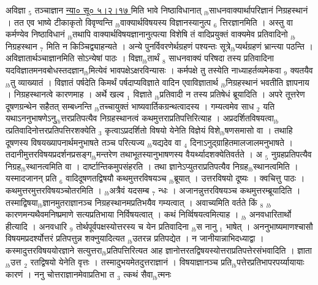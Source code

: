 \documentclass[article,12pt,a4paper]{memoir}%
\begin{document}
	  
	  \pstart \leavevmode%
	अविज्ञा {\tiny $_{5}$} तञ्चाज्ञान \href{http://sarit.indology.info/?cref=ns\%C5\%AB.5.2.17}{न्या० सू० ५।२।१७ } मिति भावे निष्ठाविधानात् {\tiny $_{lb}$}साधनवाक्यार्थापरिज्ञानं निग्रहस्थानं । तत एव भाष्ये टीकाकृतो विवृण्वन्ति {\tiny $_{lb}$}वाक्यार्थविषयस्य विज्ञानस्यानुत्प {\tiny $_{6}$} त्तिरज्ञानमिति । अस्तु वा कर्मण्येव निष्ठाविधानं {\tiny $_{lb}$}तथापि वाक्यार्थविषयज्ञानानुत्पत्या विशेषि तं वादिप्रयुक्तं वाक्यमेव प्रतिवादिनो {\tiny $_{lb}$}निग्रहस्थान {\tiny $_{7}$} मिति न किञ्चिद्व्याहन्यते । अन्ये पुनर्विवरणेर्थग्रहणं पश्यन्तः सूत्रे{\tiny $_{lb}$}प्यर्थग्रहणं भ्रान्त्या पठन्ति । अविज्ञातार्थञ्चाज्ञानमिति सोऽन्येषां पाठः । विज्ञा{\tiny $_{lb}$}तार्थं {\tiny $_{8}$} साधनवाक्यं परिषदा तस्य प्रतिवादिना यदविज्ञातमनवबोधस्तदज्ञान{\tiny $_{lb}$}मित्येवं भावपक्षेऽक्षरविन्यासः । कर्मपक्षे तु तस्येति नाध्याहर्तव्यमेकवा {\tiny $_{9}$} \leavevmode{} क्यतयैव {\tiny $_{lb}$}तु व्याख्यातं । विज्ञातं पर्षदेति किमर्थं पर्षदाप्यविज्ञाते वादिन एवाविज्ञातार्थ {\tiny $_{lb}$}निग्रहस्थानं भवतीति ज्ञापनाय । निग्रहस्थानत्वे कारणमाह । अर्थे खल्व {\tiny $_{1}$} विज्ञाते {\tiny $_{lb}$}प्रतिवादी न तस्य प्रतिषेधं ब्रूयादिति । अपरे तूत्तरेण दूषणग्रन्थेन सहैतत् सम्बध्नन्ति {\tiny $_{lb}$}तच्चायुक्तं भाष्यवार्तिकग्रन्थत्वादस्य । गम्यत्वमेव साध {\tiny $_{2}$} यति यथाऽननुभाषणेऽनु{\tiny $_{lb}$}त्तरप्रतिपत्यैव निग्रहस्थानत्वं कथमुत्तराप्रतिपत्तिरित्याह । अप्रदर्शितविषयत्वा{\tiny $_{lb}$}त्प्रतिवादिनोत्तरप्रतिपत्तिरशक्येति {\tiny $_{3}$} कृत्वाऽप्रदर्शितो विषयो येनेति विज्ञेयं विशे{\tiny $_{lb}$}षणसमासो वा । तथाहि दूषणस्य विषयख्यापनार्थमनुभाषते तञ्च परित्यज्य {\tiny $_{lb}$}यद्यदेव वा {\tiny $_{4}$} दिनाऽनुद्ग्राहितमालजालमनुभाषते । तदानीमुत्तरविषयप्रदर्शनप्रसङ्ग{\tiny $_{lb}$}मन्तरेण तथाभूतस्यानुभाषणस्य वैयर्थ्यादशक्येतिवर्तते । अ {\tiny $_{5}$} नुग्रहप्रतिपत्यैव निग्रह{\tiny $_{lb}$}स्थानत्वमिति वा । दार्ष्टान्तिकमुपसंहरति । तथा ज्ञानेऽप्युतराप्रतिपत्यैव निग्रह{\tiny $_{lb}$}स्थानत्वमिति । यस्मादजानन् प्रति {\tiny $_{6}$} वादिदूषणतद्विषयौ कथमुत्तरविषयञ्च {\tiny $_{lb}$}ब्रूयात् । उत्तरविषयो दूष्यः । क्वचित्तु पाठः । कथमुत्तरमुत्तरविषयञ्चोतरमिति । {\tiny $_{lb}$}अत्रैवं यदसम्ब {\tiny $_{7}$} न्धः । अजानन्नुत्तरविषयञ्च कथमुत्तरम्ब्रूयादिति । तस्माद्विषया{\tiny $_{lb}$}ज्ञानमुतराज्ञानञ्च निग्रहस्थानमप्रतिभयैव गम्यत्वात् । अवाच्यमिति वर्तते किं {\tiny $_{8}$} {\tiny $_{lb}$}कारणमन्यथैवमनिष्प्रमाणे सत्यप्रतिभाया निर्विषयत्वात् । कथं निर्व्विषयत्वमित्याह । {\tiny $_{lb}$} \leavevmode{} {\color{DodgerBlue3}अनवधारितार्थो हीत्यादि} । अनवधारि {\tiny $_{9}$} \leavevmode{} तोर्थपूर्वपक्षस्योत्तरस्य च येन प्रतिवादिना {\tiny $_{lb}$}स नानु {\tiny $_{1}$} भाषेत् । अननुभाष्यमाणश्चासौ विषयमप्रदर्श्योत्तरं प्रतिपत्तुन्न शक्नुयादित्यत {\tiny $_{lb}$}उतरन्न प्रतिपद्येत । न जानीयान्नाभिदध्याद्वा । कस्मादुत्तरविषययोरज्ञाने सत्युत्तरा{\tiny $_{lb}$}प्रतिपत्तिरित्यत आह {\color{DodgerBlue3}ज्ञानोत्तरतद्विषयस्योत्तराप्रतिपत्तेरसंभवादिति} । ज्ञाता {\tiny $_{lb}$}उत्त {\tiny $_{2}$} रतद्विषयो येनेति वृत्तः । तस्मादुभयमेतदुत्तराज्ञानं । विषयाज्ञानञ्च प्रति{\tiny $_{lb}$}पत्तेरप्रतिभापरपर्य्यायायाः कारणं । ननु चोत्तराज्ञानमेवाप्रतिभा त {\tiny $_{3}$} त्कथं सैवा{\tiny $_{lb}$}त्मनः 
\end{document}
